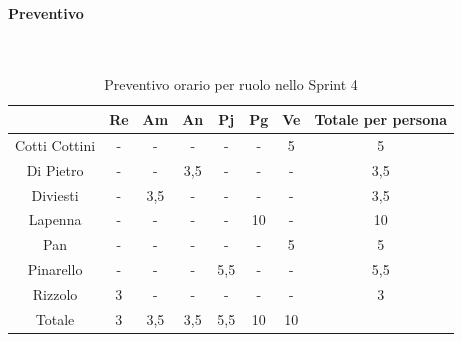 \documentclass{article}
\begin{document}
                \paragraph{Preventivo}\mbox{}\\
                \begin{table}[H]
                    \centering
                    \begin{tabular}{|c|c|c|c|c|c|c|c|}
                    \hline
                                  & Re  & Am  & An  & Pj  & Pg  & Ve  & Totale per persona \\ \hline
                    Cotti Cottini & -   & -   & -   & -   & -   & 5   & 5                  \\ \hline
                    Di Pietro     & -   & -   & 3,5 & -   & -   & -   & 3,5                \\ \hline
                    Diviesti      & -   & 3,5 & -   & -   & -   & -   & 3,5                \\ \hline
                    Lapenna       & -   & -   & -   & -   & 10  & -   & 10                 \\ \hline
                    Pan           & -   & -   & -   & -   & -   & 5   & 5                  \\ \hline
                    Pinarello     & -   & -   & -   & 5,5 & -   & -   & 5,5                \\ \hline
                    Rizzolo       & 3   & -   & -   & -   & -   & -   & 3                  \\ \hline
                    Totale        & 3   & 3,5 & 3,5 & 5,5 & 10  & 10  &                    \\ \hline
                    \end{tabular}
                    \caption{Preventivo orario per ruolo nello Sprint 4}
                \end{table}

\end{document}
